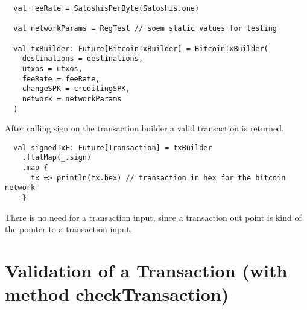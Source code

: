 \begin{lstlisting}
  val feeRate = SatoshisPerByte(Satoshis.one)

  val networkParams = RegTest // soem static values for testing

  val txBuilder: Future[BitcoinTxBuilder] = BitcoinTxBuilder(
    destinations = destinations,
    utxos = utxos,
    feeRate = feeRate,
    changeSPK = creditingSPK,
    network = networkParams
  )
\end{lstlisting}
After calling sign on the transaction builder a valid transaction is returned.
\begin{lstlisting}
  val signedTxF: Future[Transaction] = txBuilder
    .flatMap(_.sign)
    .map {
      tx => println(tx.hex) // transaction in hex for the bitcoin network
    }
\end{lstlisting}
There is no need for a transaction input, since a transaction out point is kind of the pointer to a transaction input.

\section{Validation of a Transaction (with method checkTransaction)}
